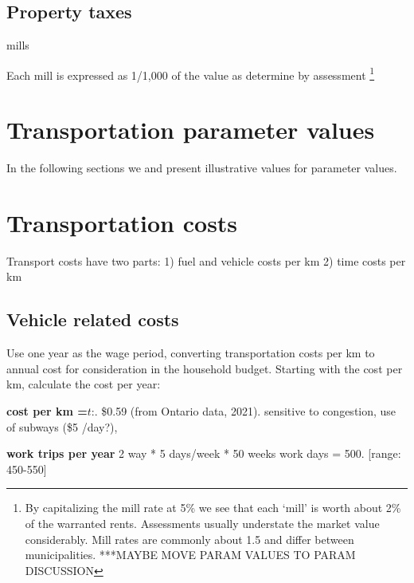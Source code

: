 \subsection{Property taxes}

mills

Each mill is expressed as  1/1,000 of the value as determine by assessment \footnote{By capitalizing the mill rate at 5\%  we see that each `mill' is worth about 2\% of the warranted rents. Assessments usually understate the market value considerably. Mill rates are commonly about 1.5 and differ between municipalities. ***MAYBE MOVE PARAM VALUES TO PARAM DISCUSSION}


\section{Transportation parameter values}
In the following sections we and present illustrative values for parameter values.


  
    
    
    
 

\section{Transportation costs}
Transport costs have two parts:
1) fuel and vehicle costs per km
2) time costs per km

\subsection{Vehicle related costs}
Use one year as the wage period, converting transportation costs per km to annual cost for consideration in the household budget. Starting with the cost per km, calculate the cost per year:

\textbf{cost per km =$\textit{t}$}:. \$0.59   (from  Ontario data, 2021). sensitive to congestion, use of subways (\$5 /day?), 

 \textbf{work trips per year} 2 way * 5 days/week * 50 weeks work days = 500. [range: 450-550]

